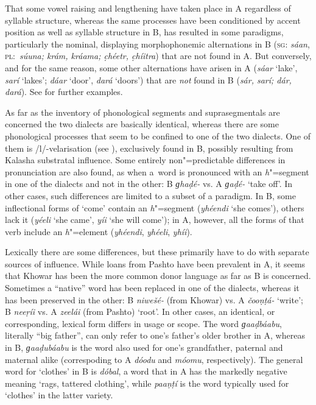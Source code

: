 That some vowel raising and lengthening have taken place in A regardless of syllable structure, whereas the same processes have been conditioned by accent position as well as syllable structure in B, has resulted in some paradigms, particularly the nominal, displaying morphophonemic alternations in B (\textsc{sg:} \textit{sáan}, \textsc{pl:}~\textit{súuna; krám, kráama; c̣héetr, c̣híitra}) that are not found in A. But conversely, and for the same reason, some other alternations have arisen in A (\textit{sáar} `lake', \textit{sarí} `lakes'; \textit{dáar} `door', \textit{dará} `doors') that are \textit{not} found in B (\textit{sár, sarí; dár, dará}). See  for further examples.

As far as the inventory of phonological segments and suprasegmentals are concerned the two dialects
are basically identical, whereas there are some phonological processes that seem to be confined to
one of the two dialects. One of them is /l/-velarisation (see ), exclusively
found in B, possibly resulting from Kalasha substratal influence. Some entirely non"=predictable differences in pronunciation are also found, as when a~word is pronounced with an \textit{h}"=segment in one of the dialects and not in the other: B \textit{ɡhaḍé-} vs. A \textit{ɡaḍé-} `take off'. In other cases, such differences are limited to a subset of a paradigm. In B, some inflectional forms of `come' contain an \textit{h}"=segment (\textit{yhéendi} `she comes'), others lack it (\textit{yéeli} `she came', \textit{yíi} `she will come'); in A, however, all the forms of that verb include an \textit{h}"=element (\textit{yhéendi}, \textit{yhéeli}, \textit{yhíi}).


Lexically there are some differences, but these primarily have to do with separate sources of influence. While loans from Pashto have been prevalent in A, it seems that Khowar has been the more common donor language as far as B is concerned. Sometimes a ``native'' word has been replaced in one of the dialects, whereas it has been preserved in the other: B \textit{niwešé-} (from Khowar) vs. A \textit{čooṇṭá-} `write'; B \textit{neeṛíi} vs. A \textit{zeelái} (from Pashto) `root'. In other cases, an identical, or corresponding, lexical form differs in usage or scope. The word \textit{ɡaaḍbáabu}, literally ``big father'', can only refer to one's father's older brother in A, whereas in B, \textit{ɡaaḍubáabu} is the word also used for one's grandfather, paternal and maternal alike (correspoding to A \textit{dóodu} and \textit{móomu}, respectively). The general word for `clothes' in B is \textit{dóbal}, a word that in A has the markedly negative meaning `rags, tattered clothing', while \textit{paaṇṭí} is the word typically used for `clothes' in the latter variety.


